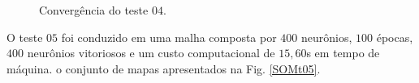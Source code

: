 \begin{figure}[H]
	\centering
	\setlength{\fboxsep}{8pt}
	\setlength{\fboxrule}{0.1pt}
	\caption{Convergência do teste $04$.}
	\label{Conv04}
\end{figure} 

O teste $05$ foi conduzido em uma malha composta por $400$ neurônios, $100$ épocas, $400$ neurônios vitoriosos e um custo computacional de $15,60$s em tempo de máquina. o conjunto de mapas apresentados na Fig. \ref{SOMt05}.


